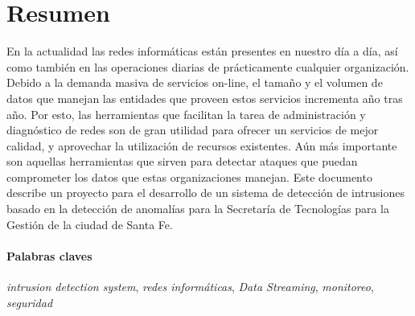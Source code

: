 \section*{Resumen}

En la actualidad las redes informáticas están presentes en nuestro día a día, así como también en las operaciones diarias de prácticamente cualquier organización. Debido a la demanda masiva de servicios on-line, el tamaño y el volumen de datos que manejan las entidades que proveen estos servicios incrementa año tras año. Por esto, las herramientas que facilitan la tarea de administración y diagnóstico de redes son de gran utilidad para ofrecer un servicios de mejor calidad, y aprovechar la utilización de recursos existentes. Aún más importante son aquellas herramientas que sirven para detectar ataques que puedan comprometer los datos que estas organizaciones manejan.
Este documento describe un proyecto para el desarrollo de un sistema de detección de intrusiones basado en la detección de anomalías para la Secretaría de Tecnologías para la Gestión de la ciudad de Santa Fe.

\paragraph{Palabras claves} \textit{intrusion detection system}, \textit{redes informáticas}, \textit{Data Streaming}, \textit{monitoreo}, \textit{seguridad}
\newpage